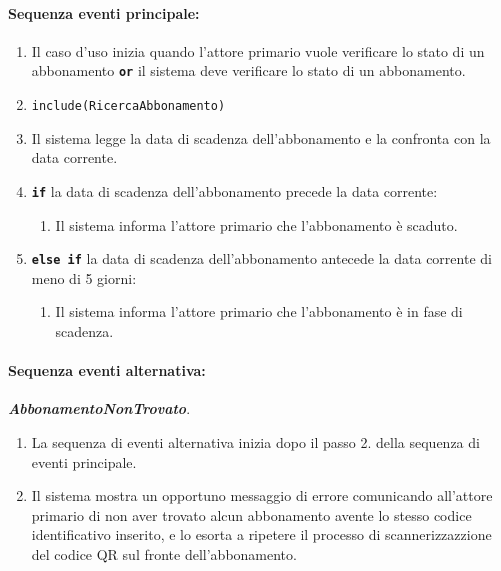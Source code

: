 \documentclass{article}
\begin{document}
	\paragraph{Sequenza eventi principale:}
\begin{enumerate}[itemsep=8pt,parsep=0pt]
    
    \item Il caso d’uso inizia quando l'attore primario vuole verificare lo stato di un abbonamento \texttt{\textbf{or}} il sistema deve verificare lo stato di un abbonamento.
    
    \item \texttt{include(RicercaAbbonamento)}

	\item Il sistema legge la data di scadenza dell'abbonamento e la confronta con la data corrente.
    
    \item \texttt{\textbf{if}} la data di scadenza dell’abbonamento precede la data corrente:
          \begin{enumerate}	[leftmargin=28pt]
          \item Il sistema informa l'attore primario che l'abbonamento è scaduto.
          \end{enumerate}

          \item\texttt{\textbf{else if}}  la data di scadenza dell’abbonamento antecede la data corrente di meno di 5 giorni:
	          \begin{enumerate}	[leftmargin=28pt]
	          	\item Il sistema informa l'attore primario che l'abbonamento è in fase di scadenza.
	          \end{enumerate}
\end{enumerate}
    
	\paragraph{Sequenza eventi alternativa:} \textbf{\textit{AbbonamentoNonTrovato}}.
	\begin{enumerate}[itemsep=8pt,parsep=0pt]
		\item La sequenza di eventi alternativa inizia dopo il passo 2. della sequenza di eventi principale.
		\item Il sistema mostra un opportuno messaggio di errore comunicando all'attore primario di non aver trovato alcun abbonamento avente lo stesso codice identificativo inserito, e lo esorta a ripetere il processo di scannerizzazzione del codice QR sul fronte dell'abbonamento.
	\end{enumerate}
    
\end{document}
